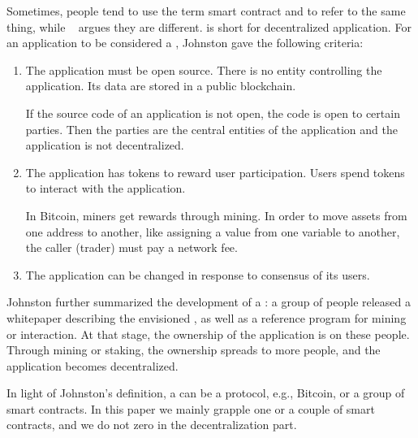 







Sometimes, people tend to use the term smart contract and {\dapp} to refer to the same thing,
while ~\cite{johnston2014general} argues they are different.
{\dapp} is short for decentralized application.
For an application to be considered a {\dapp}, Johnston gave the following criteria:

\begin{enumerate}
\item The application must be open source. There is no entity controlling the application. Its data are stored in a public blockchain.

If the source code of an application is not open, the code is open to certain parties. Then the parties are the central entities of the application and the application is not decentralized.

\item The application has tokens to reward user participation. Users spend tokens to interact with the application.

In Bitcoin, miners get rewards through mining. In order to move assets from one address to another, like assigning a value from one variable to another, the caller (trader) must pay a network fee.

\item The application can be changed in response to consensus of its users.
\end{enumerate}

Johnston further summarized the development of a {\dapp}: a group of people released a whitepaper describing the envisioned {\dapp}, as well as a reference program for mining or interaction. At that stage, the ownership of the application is on these people.
Through mining or staking, the ownership spreads to more people, and the application becomes decentralized.

In light of Johnston's definition, a {\dapp} can be a protocol, e.g., Bitcoin, or a group of smart contracts.
In this paper we mainly grapple one or a couple of smart contracts, and we do not zero in the decentralization part.

